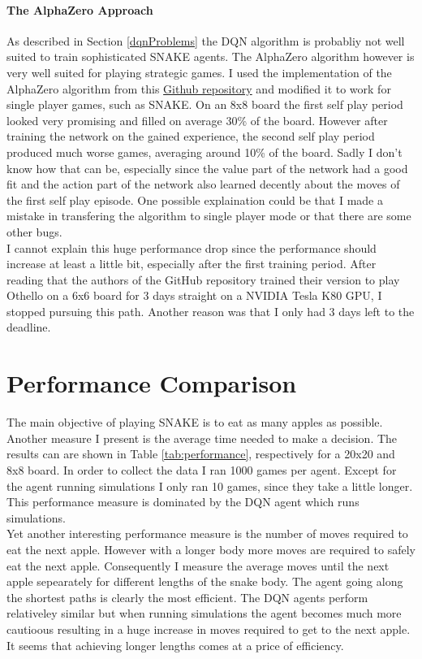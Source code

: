 \documentclass{article}
\begin{document}
\paragraph{The AlphaZero Approach} 
As described in Section \ref{dqnProblems} the DQN algorithm is probabliy not well suited to train sophisticated SNAKE agents. The AlphaZero algorithm however is very well suited for playing strategic games. I used the implementation of the AlphaZero algorithm from this \href{https://github.com/suragnair/alpha-zero-general}{Github repository} and modified it to work for single player games, such as SNAKE. On an 8x8 board the first self play period looked very promising and filled on average 30\% of the board. However after training the network on the gained experience, the second self play period produced much worse games, averaging around 10\% of the board. Sadly I don't know how that can be, especially since the value part of the network had a good fit and the action part of the network also learned decently about the moves of the first self play episode. One possible explaination could be that I made a mistake in transfering the algorithm to single player mode or that there are some other bugs. \\
I cannot explain this huge performance drop since the performance should increase at least a little bit, especially after the first training period. After reading that the authors of the GitHub repository trained their version to play Othello on a 6x6 board for 3 days straight on a NVIDIA Tesla K80 GPU, I stopped pursuing this path. Another reason was that I only had 3 days left to the deadline.

\section{Performance Comparison}
\label{performance}
The main objective of playing SNAKE is to eat as many apples as possible. Another measure I present is the average time needed to make a decision. The results can are shown in Table \ref{tab:performance}, respectively for a 20x20 and 8x8 board. In order to collect the data I ran 1000 games per agent. Except for the agent running simulations I only ran 10 games, since they take a little longer. This performance measure is dominated by the DQN agent which runs simulations.\\
Yet another interesting performance measure is the number of moves required to eat the next apple. However with a longer body more moves are required to safely eat the next apple. Consequently I measure the average moves until the next apple sepearately for different lengths of the snake body. The agent going along the shortest paths is clearly the most efficient. The DQN agents perform relativeley similar but when running simulations the agent becomes much more cautioous resulting in a huge increase in moves required to get to the next apple. It seems that achieving longer lengths comes at a price of efficiency. \\
\end{document}
